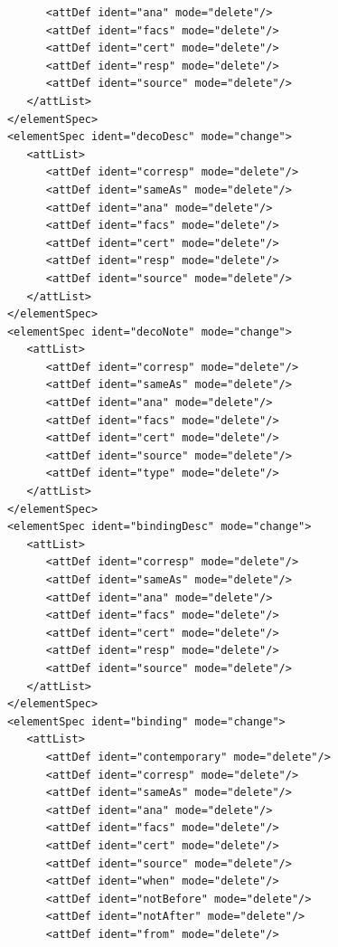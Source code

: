 \documentclass[a4paper,12pt,twoside]{book}
\begin{document}
\begin{verbatim}
                  <attDef ident="ana" mode="delete"/>
                  <attDef ident="facs" mode="delete"/>
                  <attDef ident="cert" mode="delete"/>
                  <attDef ident="resp" mode="delete"/>
                  <attDef ident="source" mode="delete"/>
               </attList>
            </elementSpec>
            <elementSpec ident="decoDesc" mode="change">
               <attList>
                  <attDef ident="corresp" mode="delete"/>
                  <attDef ident="sameAs" mode="delete"/>
                  <attDef ident="ana" mode="delete"/>
                  <attDef ident="facs" mode="delete"/>
                  <attDef ident="cert" mode="delete"/>
                  <attDef ident="resp" mode="delete"/>
                  <attDef ident="source" mode="delete"/>
               </attList>
            </elementSpec>
            <elementSpec ident="decoNote" mode="change">
               <attList>
                  <attDef ident="corresp" mode="delete"/>
                  <attDef ident="sameAs" mode="delete"/>
                  <attDef ident="ana" mode="delete"/>
                  <attDef ident="facs" mode="delete"/>
                  <attDef ident="cert" mode="delete"/>
                  <attDef ident="source" mode="delete"/>
                  <attDef ident="type" mode="delete"/>
               </attList>
            </elementSpec>
            <elementSpec ident="bindingDesc" mode="change">
               <attList>
                  <attDef ident="corresp" mode="delete"/>
                  <attDef ident="sameAs" mode="delete"/>
                  <attDef ident="ana" mode="delete"/>
                  <attDef ident="facs" mode="delete"/>
                  <attDef ident="cert" mode="delete"/>
                  <attDef ident="resp" mode="delete"/>
                  <attDef ident="source" mode="delete"/>
               </attList>
            </elementSpec>
            <elementSpec ident="binding" mode="change">
               <attList>
                  <attDef ident="contemporary" mode="delete"/>
                  <attDef ident="corresp" mode="delete"/>
                  <attDef ident="sameAs" mode="delete"/>
                  <attDef ident="ana" mode="delete"/>
                  <attDef ident="facs" mode="delete"/>
                  <attDef ident="cert" mode="delete"/>
                  <attDef ident="source" mode="delete"/>
                  <attDef ident="when" mode="delete"/>
                  <attDef ident="notBefore" mode="delete"/>
                  <attDef ident="notAfter" mode="delete"/>
                  <attDef ident="from" mode="delete"/>

\end{verbatim}
\end{document}
